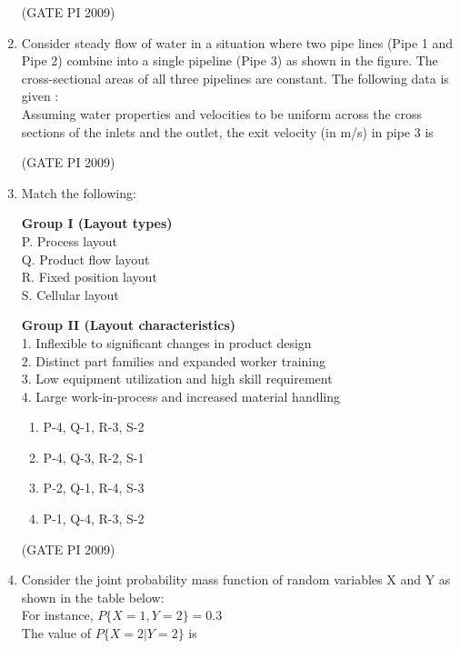 \documentclass[journal,12pt,onecolumn]{IEEEtran}
\theoremstyle{remark}
\begin{document}
\begin{enumerate}[label=Q.\arabic*]
\hfill (GATE PI 2009)
\item Consider steady flow of water in a situation where two pipe lines (Pipe 1 and Pipe 2) combine into a single pipeline (Pipe 3) as shown in the figure. The cross-sectional areas of all three pipelines are constant. The following data is given : \\

Assuming water properties and velocities to be uniform across the cross sections of the inlets and the outlet, the exit velocity (in m/s) in pipe 3 is
\begin{enumerate}[label=(\Alph*)]
\end{enumerate}
\hfill (GATE PI 2009)
\item Match the following: \\
\noindent
\begin{minipage}[t]{0.45\textwidth}
\textbf{Group I (Layout types)}\\[0.5em]
P. Process layout \\
Q. Product flow layout \\
R. Fixed position layout \\
S. Cellular layout
\end{minipage}
\hfill
\begin{minipage}[t]{0.9\textwidth}
\textbf{Group II (Layout characteristics)}\\[0.5em]
1. Inflexible to significant changes in product design \\
2. Distinct part families and expanded worker training \\
3. Low equipment utilization and high skill requirement \\
4. Large work-in-process and increased material handling
\end{minipage}

\begin{multicols}{2}
\begin{enumerate}[label=(\Alph*)]
    \item P-4, Q-1, R-3, S-2
    \item P-4, Q-3, R-2, S-1
    \item P-2, Q-1, R-4, S-3
    \item P-1, Q-4, R-3, S-2
\end{enumerate}
\end{multicols}
\hfill (GATE PI 2009)
\item Consider the joint probability mass function of random variables X and Y as shown in the table below: \\
For instance, $P\{X=1, Y=2\} = 0.3$
$$

$$
The value of $P\{X=2|Y=2\}$ is


\end{enumerate}
\end{document}
